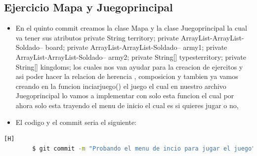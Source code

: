 \documentclass{article}
\begin{document}
	\subsection{Ejercicio Mapa y Juegoprincipal}
	\begin{itemize}	
		\item En el quinto commit creamos la clase Mapa y la clase Juegoprincipal la cual va tener sus atributos private String territory;
		private ArrayList-ArrayList-Soldado-- board;
		private ArrayList-ArrayList-Soldado-- army1;
		private ArrayList-ArrayList-Soldado-- army2;
		private String[] typesterritory;
		private String[] kingdoms; los cuales nos van ayudar para la creacion de ejercitos y asi poder hacer la relacion de herencia , composicion y tambien ya vamos creando en la funcion inciarjuego() el juego el cual en nuestro archivo Juegoprincipal lo vamos a implementar con solo esta funcion el cual por ahora solo esta trayendo el menu de inicio el cual es si quieres jugar o no,
		\item El codigo y el commit seria el siguiente:
	\end{itemize}	
	\begin{lstlisting}[language=bash,caption={Commit}][H]
		$ git commit -m "Probando el menu de incio para jugar el juego"
	\end{lstlisting}	
\end{document}
